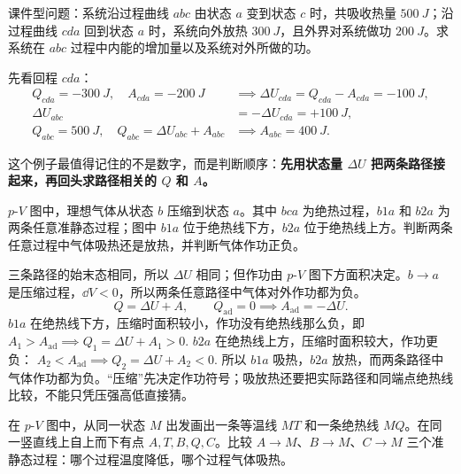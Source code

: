 \documentclass[lang=cn,11pt]{elegantbook}
\begin{document}
\begin{exercise}[同一初末态下怎样分清谁与路径有关]
课件型问题：系统沿过程曲线 \(abc\) 由状态 \(a\) 变到状态 \(c\) 时，共吸收热量 \(\SI{500}{J}\)；沿过程曲线 \(cda\) 回到状态 \(a\) 时，系统向外放热 \(\SI{300}{J}\)，且外界对系统做功 \(\SI{200}{J}\)。求系统在 \(abc\) 过程中内能的增加量以及系统对外所做的功。
\end{exercise}

\begin{solution}
先看回程 \(cda\)：
\begin{align*}
Q_{cda}=-\SI{300}{J},\quad A_{cda}=-\SI{200}{J}
&\implies \Delta U_{cda}=Q_{cda}-A_{cda}=-\SI{100}{J},\\
\Delta U_{abc}&=-\Delta U_{cda}=+\SI{100}{J},\\
Q_{abc}=\SI{500}{J},\quad Q_{abc}=\Delta U_{abc}+A_{abc}
&\implies A_{abc}=\SI{400}{J}.
\end{align*}

这个例子最值得记住的不是数字，而是判断顺序：\textbf{先用状态量 \(\Delta U\) 把两条路径接起来，再回头求路径相关的 \(Q\) 和 \(A\)。}
\end{solution}

\begin{exercise}
\(p\)-\(V\) 图中，理想气体从状态 \(b\) 压缩到状态 \(a\)。其中 \(bca\) 为绝热过程，\(b1a\) 和 \(b2a\) 为两条任意准静态过程；图中 \(b1a\) 位于绝热线下方，\(b2a\) 位于绝热线上方。判断两条任意过程中气体吸热还是放热，并判断气体作功正负。
\end{exercise}

\begin{solution}
三条路径的始末态相同，所以 \(\Delta U\) 相同；但作功由 \(p\)-\(V\) 图下方面积决定。\(b\to a\) 是压缩过程，\(\dd V<0\)，所以两条任意路径中气体对外作功都为负。
\[
Q=\Delta U+A,\qquad Q_{\mathrm{ad}}=0\implies A_{\mathrm{ad}}=-\Delta U.
\]
\(b1a\) 在绝热线下方，压缩时面积较小，作功没有绝热线那么负，即
 \(A_1>A_{\mathrm{ad}} \implies Q_1=\Delta U+A_1>0.\) 
\(b2a\) 在绝热线上方，压缩时面积较大，作功更负：
 \(A_2<A_{\mathrm{ad}} \implies Q_2=\Delta U+A_2<0.\) 
所以 \(b1a\) 吸热，\(b2a\) 放热，而两条路径中气体作功都为负。“压缩”先决定作功符号；吸放热还要把实际路径和同端点绝热线比较，不能只凭压强高低直接猜。
\end{solution}

\begin{exercise}
在 \(p\)-\(V\) 图中，从同一状态 \(M\) 出发画出一条等温线 \(MT\) 和一条绝热线 \(MQ\)。在同一竖直线上自上而下有点 \(A,T,B,Q,C\)。比较 \(A\to M\)、\(B\to M\)、\(C\to M\) 三个准静态过程：哪个过程温度降低，哪个过程气体吸热。
\end{exercise}
\end{document}
